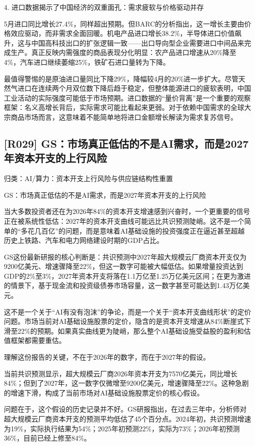 \documentclass[11pt]{ctexart}
\begin{document}
4. 进口数据揭示了中国经济的双重面孔：需求疲软与价格驱动并存

5月进口同比增长27.4\%，同样超出预期。但BARC的分析指出，这一增长主要由价格效应驱动，而非需求全面回暖。机电产品进口增长38.2\%，半导体进口价值飙升，这与中国高科技出口的扩张逻辑一致——出口导向型企业需要进口中间品来完成生产。真正反映内需强度的商品表现分化明显：农产品进口增速从20\%降至4\%，汽车进口继续萎缩25\%，铁矿石进口量转为下降。

最值得警惕的是原油进口量同比下降29\%，降幅较4月的20\%进一步扩大。尽管天然气进口在连续两个月双位数下降后趋于稳定，但整体能源进口的疲软表明，中国工业活动的实际强度可能低于市场预期。进口数据的“量价背离”是一个重要的观察框架：名义高增长背后，实际需求可能比看起来更弱。对于依赖中国需求的全球大宗商品市场而言，这意味着不能简单地将进口金额增长解读为需求复苏信号。

\subsection{[R029] GS：市场真正低估的不是AI需求，而是2027年资本开支的上行风险}
{\small\color{refgray}归类：AI/算力：资本开支上行风险与供应链结构性重置}

GS：市场真正低估的不是AI需求，而是2027年资本开支的上行风险

当大多数投资者还在为2026年84\%的资本开支增速感到兴奋时，一个更重要的信号正在被系统性低估：2027年的资本开支曲线可能远比共识预测陡峭。这不是一个简单的“多花几百亿”的问题，而是意味着AI基础设施的投资强度正在逼近甚至超越历史上铁路、汽车和电力网络建设时期的GDP占比。

GS这份最新研报的核心判断是：共识预测中2027年超大规模云厂商资本开支仅为9200亿美元、增速骤降至22\%，但这一数字可能被大幅低估。如果增量投资达到GDP的2\%至3\%，2027年资本开支将落在1.1万亿至1.25万亿美元区间；在更为激进的情景下，基于现金流和投资级债券市场容量，这一数字甚至可能达到1.43万亿美元。

这不是一个关于“AI有没有泡沫”的争论，而是一个关于“资本开支曲线形状”的定价问题。市场当前对AI基础设施股票的定价，隐含的是资本开支增速从84\%断崖式下滑至22\%的预期。如果真实曲线更为陡峭，那么整个AI基础设施受益股的盈利和估值框架都需要重估。

理解这份报告的关键，不在于2026年的数字，而在于2027年的假设。

当前共识预测显示，超大规模云厂商2026年资本开支为7570亿美元，同比增长84\%；但到了2027年，这一数字仅微增至9200亿美元，增速骤降至22\%。这种急剧的增速下滑，构成了当前市场对AI基础设施股票定价的核心假设。

问题在于，这个假设的历史记录并不好。GS研报指出，在过去三年中，分析师对超大规模云厂商资本开支的预测平均低估了45个百分点。2024年初，共识预测增速为19\%，实际执行结果为54\%；2025年初预测22\%，实际为73\%；2026年初预测36\%，目前已经上修至84\%。
\end{document}
